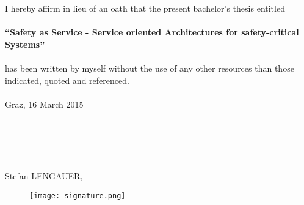 
I hereby affirm in lieu of an oath that the present bachelor's thesis entitled\\
\\
\textbf{``Safety as Service - Service oriented Architectures for safety-critical Systems''}\\
\\
has been written by myself without the use of any other resources than those indicated, quoted and referenced.\\
\\
Graz, 16 March 2015\\
\\
\\
\\
\\
\\
Stefan LENGAUER,
\begin{figure}[ht]
\texttt{[image: signature.png]}
\end{figure}
